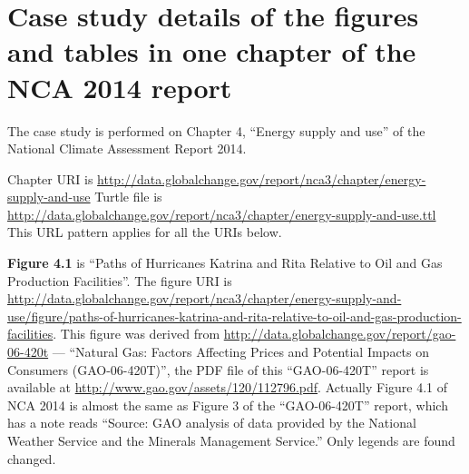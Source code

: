 \chapter{Case study details of the figures and tables in one chapter of the NCA 2014 report}
\label{ch:case-study}
The case study is performed on Chapter 4, ``Energy supply and use'' of the National Climate Assessment Report 2014.

Chapter URI is \url{http://data.globalchange.gov/report/nca3/chapter/energy-supply-and-use}
Turtle file is \url{http://data.globalchange.gov/report/nca3/chapter/energy-supply-and-use.ttl}
This URL pattern applies for all the URIs below.

\textbf{Figure 4.1} is ``Paths of Hurricanes Katrina and Rita Relative to Oil and Gas Production Facilities''. The
figure URI is \url{http://data.globalchange.gov/report/nca3/chapter/energy-supply-and-use/figure/paths-of-hurricanes-katrina-and-rita-relative-to-oil-and-gas-production-facilities}.
This figure was derived from \url{http://data.globalchange.gov/report/gao-06-420t} --- ``Natural Gas: Factors Affecting Prices and Potential Impacts on Consumers (GAO-06-420T)'', the 
PDF file of this ``GAO-06-420T'' report is available at \url{http://www.gao.gov/assets/120/112796.pdf}.
Actually Figure 4.1 of NCA 2014 is almost the same as Figure 3 of the ``GAO-06-420T'' report, which has a note reads ``Source: GAO analysis of data provided by the National Weather Service and the Minerals Management Service.''
Only legends are found changed.


